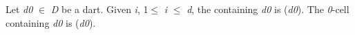 Let \emph{d0} $\in$ \emph{D} be a dart. Given \emph{i}, 1$\leq$ \emph{i} $\leq$ \emph{d},
the  containing \emph{d0} is 
\orbit{\betaun{},$\ldots$,\betaimun{},\betaipun{},$\ldots$,\betad{}}(\emph{d0}).
The \emph{0}-cell  containing \emph{d0} is 
(\emph{d0}).



